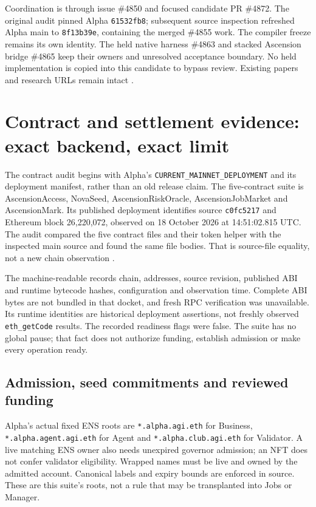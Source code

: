 \documentclass[11pt,letterpaper]{article}
\theoremstyle{definition}\newtheorem{definition}[theorem]{Definition}
\theoremstyle{remark}\newtheorem{remark}[theorem]{Remark}
\begin{document}
Coordination is through issue \#4850 and focused candidate PR \#4872. The original audit pinned Alpha \texttt{61532fb8}; subsequent source inspection refreshed Alpha main to \texttt{8f13b39e}, containing the merged \#4855 work. The compiler freeze remains its own identity. The held native harness \#4863 and stacked Ascension bridge \#4865 keep their owners and unresolved acceptance boundary. No held implementation is copied into this candidate to bypass review. Existing papers and research URLs remain intact \citep{coordination,compiler,existingfoundry}.

\section{Contract and settlement evidence: exact backend, exact limit}
\label{sec:contracts}
The contract audit begins with Alpha's \texttt{CURRENT\_MAINNET\_DEPLOYMENT} and its deployment manifest, rather than an old release claim. The five-contract suite is AscensionAccess, NovaSeed, AscensionRiskOracle, AscensionJobMarket and AscensionMark. Its published deployment identifies source \texttt{c0fc5217} and Ethereum block 26,220,072, observed on 18 October 2026 at 14:51:02.815 UTC. The audit compared the five contract files and their token helper with the inspected main source and found the same file bodies. That is source-file equality, not a new chain observation \citep{alphadeployment,alphasuite}.

The machine-readable  records chain, addresses, source revision, published ABI and runtime bytecode hashes, configuration and observation time. Complete ABI bytes are not bundled in that docket, and fresh RPC verification was unavailable. Its runtime identities are historical deployment assertions, not freshly observed \texttt{eth\_getCode} results. The recorded readiness flags were false. The suite has no global pause; that fact does not authorize funding, establish admission or make every operation ready.

\subsection{Admission, seed commitments and reviewed funding}
Alpha's actual fixed ENS roots are \texttt{*.alpha.agi.eth} for Business, \texttt{*.alpha.agent.agi.eth} for Agent and \texttt{*.alpha.club.agi.eth} for Validator. A live matching ENS owner also needs unexpired governor admission; an NFT does not confer validator eligibility. Wrapped names must be live and owned by the admitted account. Canonical labels and expiry bounds are enforced in source. These are this suite's roots, not a rule that may be transplanted into Jobs or Manager.
\end{document}
